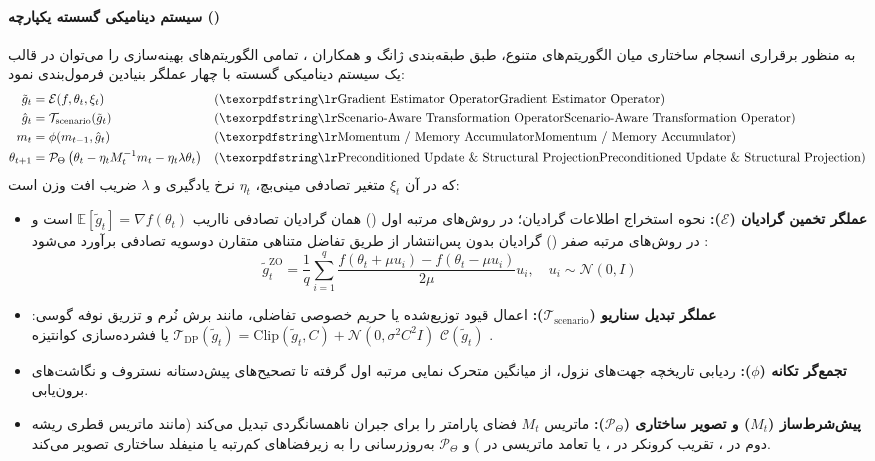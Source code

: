 \paragraph*{سیستم دینامیکی گسسته یکپارچه ()}
به منظور برقراری انسجام ساختاری میان الگوریتم‌های متنوع، طبق طبقه‌بندی ژانگ و همکاران \cite{zhang2026evolution}، تمامی الگوریتم‌های بهینه‌سازی را می‌توان در قالب یک سیستم دینامیکی گسسته با چهار عملگر بنیادین فرمول‌بندی نمود:
\begin{equation}
    \begin{aligned}
        \tilde{g}_t &= \mathcal{E}(f, \theta_t, \xi_t) && \text{(\en{Gradient Estimator Operator})} \\
        \hat{g}_t &= \mathcal{T}_{\text{scenario}}(\tilde{g}_t) && \text{(\en{Scenario-Aware Transformation Operator})} \\
        m_t &= \phi(m_{t-1}, \hat{g}_t) && \text{(\en{Momentum / Memory Accumulator})} \\
        \theta_{t+1} &= \mathcal{P}_{\Theta} \left( \theta_t - \eta_t M_t^{-1} m_t - \eta_t \lambda \theta_t \right) && \text{(\en{Preconditioned Update \& Structural Projection})}
    \end{aligned}
\end{equation}
که در آن $\xi_t$ متغیر تصادفی مینی‌بچ، $\eta_t$ نرخ یادگیری و $\lambda$ ضریب افت وزن است:
\begin{itemize}
    \item \textbf{عملگر تخمین گرادیان ($\mathcal{E}$):} نحوه استخراج اطلاعات گرادیان؛ در روش‌های مرتبه اول () همان گرادیان تصادفی نااریب $\mathbb{E}[\tilde{g}_t] = \nabla f(\theta_t)$ است و در روش‌های مرتبه صفر () گرادیان بدون پس‌انتشار از طریق تفاضل متناهی متقارن دوسویه تصادفی برآورد می‌شود \cite{zhang2026evolution}:
    \begin{equation}
        \tilde{g}_t^{\text{ZO}} = \frac{1}{q} \sum_{i=1}^q \frac{f(\theta_t + \mu u_i) - f(\theta_t - \mu u_i)}{2\mu} u_i, \quad u_i \sim \mathcal{N}(0, I)
    \end{equation}
    \item \textbf{عملگر تبدیل سناریو ($\mathcal{T}_{\text{scenario}}$):} اعمال قیود توزیع‌شده یا حریم خصوصی تفاضلی، مانند برش نُرم و تزریق نوفه گوسی: $\mathcal{T}_{\text{DP}}(\tilde{g}_t) = \text{Clip}(\tilde{g}_t, C) + \mathcal{N}(0, \sigma^2 C^2 I)$ یا فشرده‌سازی کوانتیزه $\mathcal{C}(\tilde{g}_t)$ \cite{zhang2026evolution}.
    \item \textbf{تجمع‌گر تکانه ($\phi$):} ردیابی تاریخچه جهت‌های نزول، از میانگین متحرک نمایی مرتبه اول گرفته تا تصحیح‌های پیش‌دستانه نستروف و نگاشت‌های برون‌یابی.
    \item \textbf{پیش‌شرط‌ساز ($M_t$) و تصویر ساختاری ($\mathcal{P}_{\Theta}$):} ماتریس $M_t$ فضای پارامتر را برای جبران ناهمسانگردی تبدیل می‌کند (مانند ماتریس قطری ریشه دوم در ، تقریب کرونکر در ، یا تعامد ماتریسی در ) و $\mathcal{P}_\Theta$ به‌روزرسانی را به زیرفضاهای کم‌رتبه یا منیفلد ساختاری تصویر می‌کند.
\end{itemize}

